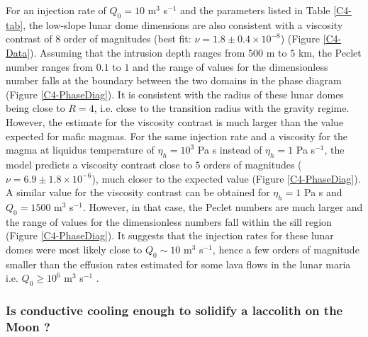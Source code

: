 For an injection rate of  $Q_0=10$ m$^{3}$ s$^{-1}$ and the parameters
listed in Table \ref{C4-tab}, the  low-slope lunar dome dimensions are
also consistent with  a viscosity contrast of $8$  order of magnitudes
(best    fit:   $\nu=1.8    \pm   0.4    \times   10^{-8}$)    (Figure
\ref{C4-Data}). Assuming that the intrusion  depth ranges from $500$ m
to $5$ km, the Peclet number ranges from $0.1$ to $1$ and the range of
values for the dimensionless number  falls at the boundary between the
two domains in  the phase diagram (Figure  \ref{C4-PhaseDiag}).  It is
consistent with the radius of these  lunar domes being close to $R=4$,
i.e.   close  to  the  transition  radius  with  the  gravity  regime.
However, the estimate  for the viscosity contrast is  much larger than
the value expected for mafic magmas. For the same injection rate and a
viscosity for the magma at  liquidus temperature of $\eta_h=10^3$ Pa s
instead  of $\eta_h=1$  Pa s$^{-1}$,  the model  predicts a  viscosity
contrast      close     to      $5$      orders     of      magnitudes
($\nu = 6.9 \pm 1.8 \times10^{-6}$), much closer to the expected value
(Figure  \ref{C4-PhaseDiag}).   A  similar  value  for  the  viscosity
contrast  can be  obtained for  $\eta_h=1$ Pa  s and  $Q_0=1500$ m$^3$
s$^{-1}$. However,  in that case,  the Peclet numbers are  much larger
and the range of values for  the dimensionless numbers fall within the
sill  region  (Figure  \ref{C4-PhaseDiag}).    It  suggests  that  the
injection  rates for  these  lunar  domes were  most  likely close  to
$Q_0\sim 10$ m$^{3}$ s$^{-1}$, hence a few orders of magnitude smaller
than the  effusion rates estimated  for some  lava flows in  the lunar
maria i.e.  $Q_0\ge 10^6$ m$^3$ s$^{-1}$ \citep{TracyKPGregg:1996wp}.

\subsubsection*{Is conductive  cooling enough to solidify  a laccolith
  on the Moon ?}
\label{sec:visc-contr-lunar}

